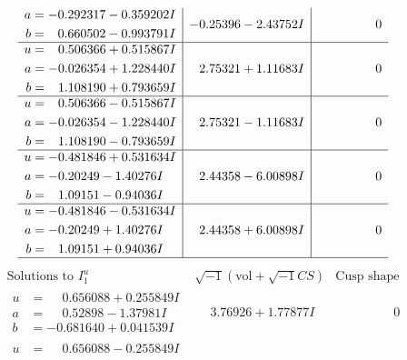 \documentclass[1p]{elsarticle_modified}
\theoremstyle{definition}
\newcommand{\I}{\sqrt{-1}}
\begin{document}
$$\begin{array}{c|c|c}
\begin{aligned}
a &= -0.292317 - 0.359202 I \\
b &= \phantom{-}0.660502 - 0.993791 I\end{aligned}
 & -0.25396 - 2.43752 I & \phantom{-0.000000 } 0 \\ \hline\begin{aligned}
u &= \phantom{-}0.506366 + 0.515867 I \\
a &= -0.026354 + 1.228440 I \\
b &= \phantom{-}1.108190 + 0.793659 I\end{aligned}
 & \phantom{-}2.75321 + 1.11683 I & \phantom{-0.000000 } 0 \\ \hline\begin{aligned}
u &= \phantom{-}0.506366 - 0.515867 I \\
a &= -0.026354 - 1.228440 I \\
b &= \phantom{-}1.108190 - 0.793659 I\end{aligned}
 & \phantom{-}2.75321 - 1.11683 I & \phantom{-0.000000 } 0 \\ \hline\begin{aligned}
u &= -0.481846 + 0.531634 I \\
a &= -0.20249 - 1.40276 I \\
b &= \phantom{-}1.09151 - 0.94036 I\end{aligned}
 & \phantom{-}2.44358 - 6.00898 I & \phantom{-0.000000 } 0 \\ \hline\begin{aligned}
u &= -0.481846 - 0.531634 I \\
a &= -0.20249 + 1.40276 I \\
b &= \phantom{-}1.09151 + 0.94036 I\end{aligned}
 & \phantom{-}2.44358 + 6.00898 I & \phantom{-0.000000 } 0\\
 \hline 
 \end{array}$$\newpage$$\begin{array}{c|c|c}  
\text{Solutions to }I^u_{1}& \I (\text{vol} + \sqrt{-1}CS) & \text{Cusp shape}\\
 \hline 
\begin{aligned}
u &= \phantom{-}0.656088 + 0.255849 I \\
a &= \phantom{-}0.52898 - 1.37981 I \\
b &= -0.681640 + 0.041539 I\end{aligned}
 & \phantom{-}3.76926 + 1.77877 I & \phantom{-0.000000 } 0 \\ \hline\begin{aligned}
u &= \phantom{-}0.656088 - 0.255849 I \\

\end{aligned}
\end{array}$$
\end{document}
